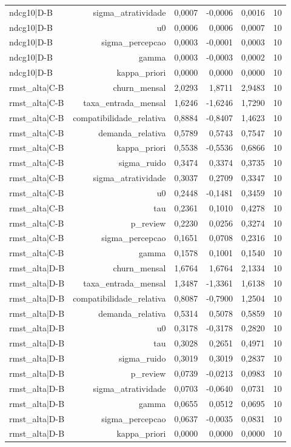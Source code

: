 \begin{table}[ht]
\begin{tabular}{lrrrrr}
ndcg10|D-B & sigma\_atratividade & 0,0007 & -0,0006 & 0,0016 & 10 \\
ndcg10|D-B & u0 & 0,0006 & 0,0006 & 0,0007 & 10 \\
ndcg10|D-B & sigma\_percepcao & 0,0003 & -0,0001 & 0,0003 & 10 \\
ndcg10|D-B & gamma & 0,0003 & -0,0003 & 0,0002 & 10 \\
ndcg10|D-B & kappa\_priori & 0,0000 & 0,0000 & 0,0000 & 10 \\
rmst\_alta|C-B & churn\_mensal & 2,0293 & 1,8711 & 2,9483 & 10 \\
rmst\_alta|C-B & taxa\_entrada\_mensal & 1,6246 & -1,6246 & 1,7290 & 10 \\
rmst\_alta|C-B & compatibilidade\_relativa & 0,8884 & -0,8407 & 1,4623 & 10 \\
rmst\_alta|C-B & demanda\_relativa & 0,5789 & 0,5743 & 0,7547 & 10 \\
rmst\_alta|C-B & kappa\_priori & 0,5538 & -0,5536 & 0,6866 & 10 \\
rmst\_alta|C-B & sigma\_ruido & 0,3474 & 0,3374 & 0,3735 & 10 \\
rmst\_alta|C-B & sigma\_atratividade & 0,3037 & 0,2709 & 0,3347 & 10 \\
rmst\_alta|C-B & u0 & 0,2448 & -0,1481 & 0,3459 & 10 \\
rmst\_alta|C-B & tau & 0,2361 & 0,1010 & 0,4278 & 10 \\
rmst\_alta|C-B & p\_review & 0,2230 & 0,0256 & 0,3274 & 10 \\
rmst\_alta|C-B & sigma\_percepcao & 0,1651 & 0,0708 & 0,2316 & 10 \\
rmst\_alta|C-B & gamma & 0,1578 & 0,1001 & 0,1540 & 10 \\
rmst\_alta|D-B & churn\_mensal & 1,6764 & 1,6764 & 2,1334 & 10 \\
rmst\_alta|D-B & taxa\_entrada\_mensal & 1,3487 & -1,3361 & 1,6138 & 10 \\
rmst\_alta|D-B & compatibilidade\_relativa & 0,8087 & -0,7900 & 1,2504 & 10 \\
rmst\_alta|D-B & demanda\_relativa & 0,5314 & 0,5078 & 0,5859 & 10 \\
rmst\_alta|D-B & u0 & 0,3178 & -0,3178 & 0,2820 & 10 \\
rmst\_alta|D-B & tau & 0,3028 & 0,2651 & 0,4971 & 10 \\
rmst\_alta|D-B & sigma\_ruido & 0,3019 & 0,3019 & 0,2837 & 10 \\
rmst\_alta|D-B & p\_review & 0,0739 & -0,0213 & 0,0983 & 10 \\
rmst\_alta|D-B & sigma\_atratividade & 0,0703 & -0,0640 & 0,0731 & 10 \\
rmst\_alta|D-B & gamma & 0,0655 & 0,0512 & 0,0695 & 10 \\
rmst\_alta|D-B & sigma\_percepcao & 0,0637 & -0,0035 & 0,0831 & 10 \\
rmst\_alta|D-B & kappa\_priori & 0,0000 & 0,0000 & 0,0000 & 10 \\
\hline
\end{tabular}
\end{table}
